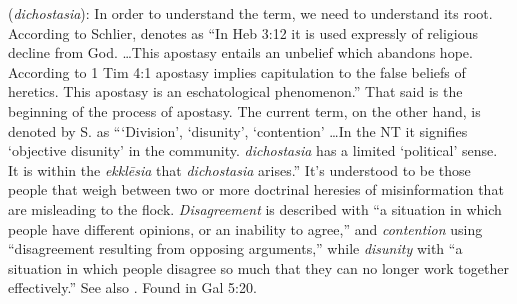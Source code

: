 \item[Disunity,]

(\textit{dichostasia}):
In order to understand the term, we need to understand its root. 
According to Schlier,  denotes as ``In Heb 3:12 it is used expressly of religious decline from God. \ldots This apostasy entails an unbelief which abandons hope. According to 1 Tim 4:1 apostasy implies capitulation to the false beliefs of heretics. This apostasy is an eschatological phenomenon.'' 
That said is the beginning of the process of apostasy. The current term, on the other hand, is denoted by S. as ```Division', `disunity', `contention' \ldots In the NT it signifies `objective disunity' in the community. \emph{dichostasia} has a limited `political' sense. It is within the \emph{ekklēsia} that \emph{dichostasia} arises.'' 
It's understood to be those people that weigh between two or more doctrinal heresies of misinformation that are misleading to the flock. \emph{Disagreement} is described with ``a situation in which people have different opinions, or an inability to agree,'' and \emph{contention} using ``disagreement resulting from opposing arguments,'' while \emph{disunity} with ``a situation in which people disagree so much that they can no longer work together effectively.'' See also .
Found in Gal 5:20.
